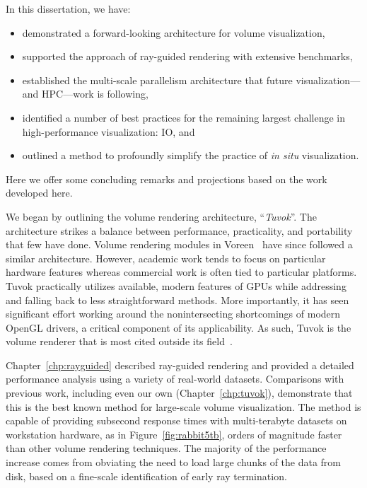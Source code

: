 In this dissertation, we have:
\begin{itemize}
	\item demonstrated a forward-looking architecture for volume visualization,
	\item supported the approach of ray-guided rendering with extensive
benchmarks,
	\item established the multi-scale parallelism architecture that future
	visualization---and HPC---work is following,
	\item identified a number of best practices for the remaining largest
challenge in high-performance visualization: IO, and
	\item outlined a method to profoundly simplify the practice of \textit{in
situ} visualization.
\end{itemize}
Here we offer some concluding remarks and projections based on the work
developed here.

We began by outlining the volume rendering architecture,
``\textit{Tuvok}''.  The architecture strikes a balance between
performance, practicality, and portability that few have done.  Volume
rendering modules in Voreen~\cite{Needed} have since followed a similar
architecture.  However, academic work tends to focus on particular
hardware features whereas commercial work is often tied to particular
platforms.  Tuvok practically utilizes available, modern features of
GPUs while addressing and falling back to less straightforward methods.
More importantly, it has seen significant effort working around the
nonintersecting shortcomings of modern OpenGL drivers, a critical
component of its applicability.  As such, Tuvok is the volume renderer
that is most cited outside its field~\cite{Needed}.

Chapter~\ref{chp:rayguided} described ray-guided rendering and provided
a detailed performance analysis using a variety of real-world datasets.
Comparisons with previous work, including even our own
(Chapter~\ref{chp:tuvok}), demonstrate that this is the best known
method for large-scale volume visualization.  The method is capable of
providing subsecond response times with multi-terabyte datasets on
workstation hardware, as in Figure~\ref{fig:rabbit5tb}, orders of
magnitude faster than other volume rendering techniques.  The majority
of the performance increase comes from obviating the need to load large
chunks of the data from disk, based on a fine-scale identification of
early ray termination.


